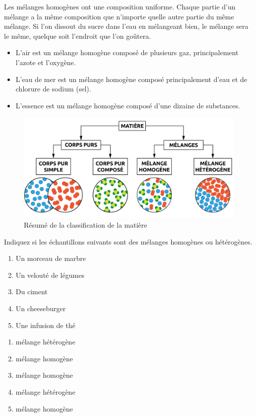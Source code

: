 \documentclass[
  11pt,
  a4paper,
  openany]{book}
\providecommand{\tightlist}{%
  \setlength{\itemsep}{0pt}\setlength{\parskip}{0pt}}
\begin{document}
Les mélanges homogènes ont une composition uniforme. Chaque partie d'un mélange a la même composition que n'importe quelle autre partie du même mélange. Si l'on dissout du sucre dans l'eau en mélangeant bien, le mélange sera le même, quelque soit l'endroit que l'on goûtera.

\begin{itemize}
\tightlist
\item
  L'air est un mélange homogène composé de plusieurs gaz, principalement l'azote et l'oxygène.
\item
  L'eau de mer est un mélange homogène composé principalement d'eau et de chlorure de sodium (sel).
\item
  L'essence est un mélange homogène composé d'une dizaine de substances.
\end{itemize}

\begin{figure}

{\centering \includegraphics[width=0.67\linewidth]{images/schema-matiere} 

}

\caption{Résumé de la classification de la matière}\label{fig:schema-matiere}
\end{figure}

\begin{Exercise}

Indiquez si les échantillons suivants sont des mélanges homogènes ou hétérogènes.

\begin{enumerate}
\def\labelenumi{\arabic{enumi}.}
\tightlist
\item
  Un morceau de marbre
\item
  Un velouté de légumes
\item
  Du ciment
\item
  Un cheeseburger
\item
  Une infusion de thé
\end{enumerate}

\end{Exercise}

\begin{Answer}

\begin{enumerate}
\def\labelenumi{\arabic{enumi}.}
\tightlist
\item
  mélange hétérogène
\item
  mélange homogène
\item
  mélange homogène
\item
  mélange hétérogène
\item
  mélange homogène
\end{enumerate}

\end{Answer}
\end{document}

